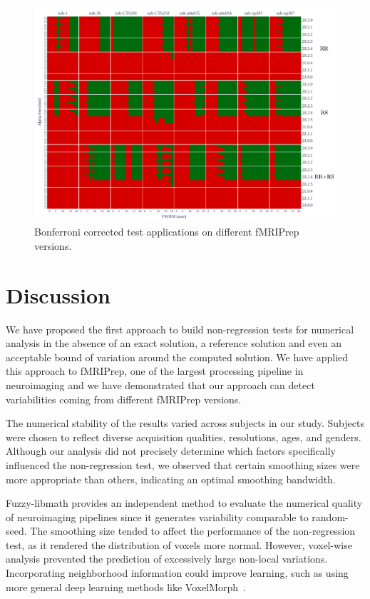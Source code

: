 \documentclass{article}
\newcommand{\fmriprep}{fMRIPrep\xspace}
\begin{document}
\begin{figure}
    \centering
    \includegraphics[width=\linewidth]{figures/fmriprep-versions/bonferroni.pdf}
    \caption{Bonferroni corrected test applications on different \fmriprep versions.}
    \label{fig:version_bonferroni}
\end{figure}


\section{Discussion}


We have proposed the first approach to build non-regression tests for numerical analysis in the absence of an exact solution, a reference solution and even an acceptable bound of variation around the computed solution. We have applied this approach to \fmriprep, one of the largest processing pipeline in neuroimaging and we have demonstrated that our approach can detect variabilities coming from different \fmriprep versions.

The numerical stability of the results varied across subjects in our study. Subjects were chosen to reflect diverse acquisition qualities, resolutions, ages, and genders. Although our analysis did not precisely determine which factors specifically influenced the non-regression test, we observed that certain smoothing sizes were more appropriate than others, indicating an optimal smoothing bandwidth.

Fuzzy-libmath provides an independent method to evaluate the numerical quality of neuroimaging pipelines since it generates variability comparable to random-seed. The smoothing size tended to affect the performance of the non-regression test, as it rendered the distribution of voxels more normal. However, voxel-wise analysis prevented the prediction of excessively large non-local variations. Incorporating neighborhood information could improve learning, such as using more general deep learning methods like VoxelMorph~\cite{balakrishnan2019voxelmorph}.
\end{document}
